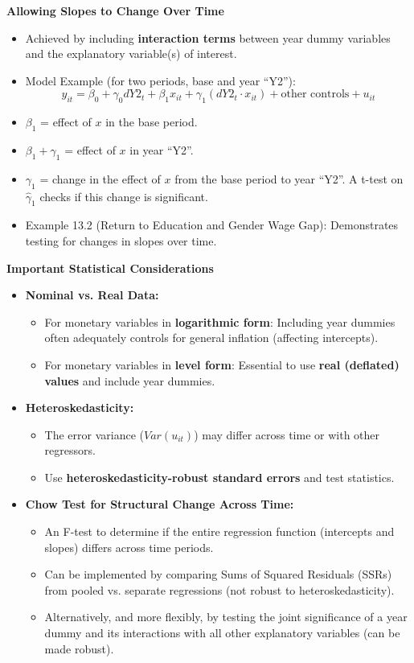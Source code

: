 \documentclass[a4paper, 10pt]{article}
\theoremstyle{definition}	%
\begin{document}
\textbf{Allowing Slopes to Change Over Time}
\begin{itemize}
    \item Achieved by including \textbf{interaction terms} between year dummy variables and the explanatory variable(s) of interest.
    \item Model Example (for two periods, base and year ``Y2''):
    \[ y_{it} = \beta_0 + \gamma_0 dY2_t + \beta_1 x_{it} + \gamma_1 (dY2_t \cdot x_{it}) + \text{other controls} + u_{it} \]
    \item \(\beta_1\) = effect of \(x\) in the base period.
    \item \(\beta_1 + \gamma_1\) = effect of \(x\) in year ``Y2''.
    \item \(\gamma_1\) = change in the effect of \(x\) from the base period to year ``Y2''. A t-test on \(\hat{\gamma}_1\) checks if this change is significant.
    \item Example 13.2 (Return to Education and Gender Wage Gap): Demonstrates testing for changes in slopes over time.
\end{itemize}

\textbf{Important Statistical Considerations}
\begin{itemize}
    \item \textbf{Nominal vs. Real Data:}
    \begin{itemize}
        \item For monetary variables in \textbf{logarithmic form}: Including year dummies often adequately controls for general inflation (affecting intercepts).
        \item For monetary variables in \textbf{level form}: Essential to use \textbf{real (deflated) values} and include year dummies.
    \end{itemize}
    \item \textbf{Heteroskedasticity:}
    \begin{itemize}
        \item The error variance (\(Var(u_{it})\)) may differ across time or with other regressors.
        \item Use \textbf{heteroskedasticity-robust standard errors} and test statistics.
    \end{itemize}
    \item \textbf{Chow Test for Structural Change Across Time:}
    \begin{itemize}
        \item An F-test to determine if the entire regression function (intercepts and slopes) differs across time periods.
        \item Can be implemented by comparing Sums of Squared Residuals (SSRs) from pooled vs. separate regressions (not robust to heteroskedasticity).
        \item Alternatively, and more flexibly, by testing the joint significance of a year dummy and its interactions with all other explanatory variables (can be made robust).
    \end{itemize}
\end{itemize}
\end{document}

